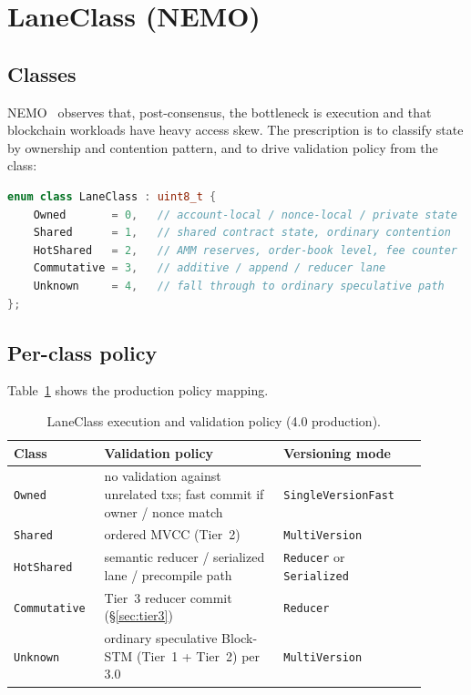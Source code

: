 \section{LaneClass (NEMO)}

\label{sec:laneclass}

\subsection{Classes}

NEMO~\cite{nemo2025} observes that, post-consensus, the bottleneck is
execution and that blockchain workloads have heavy access skew. The
prescription is to classify state by ownership and contention pattern,
and to drive validation policy from the class:

\begin{lstlisting}[language=C++]
enum class LaneClass : uint8_t {
    Owned       = 0,   // account-local / nonce-local / private state
    Shared      = 1,   // shared contract state, ordinary contention
    HotShared   = 2,   // AMM reserves, order-book level, fee counter
    Commutative = 3,   // additive / append / reducer lane
    Unknown     = 4,   // fall through to ordinary speculative path
};
\end{lstlisting}

\subsection{Per-class policy}

Table~\ref{tab:laneclass-policy} shows the production policy mapping.

\begin{table}[ht]
\centering
\small
\caption{LaneClass execution and validation policy (4.0 production).}
\label{tab:laneclass-policy}
\begin{tabular}{p{0.18\linewidth}p{0.40\linewidth}p{0.32\linewidth}}
\toprule
\textbf{Class} & \textbf{Validation policy} & \textbf{Versioning mode} \\
\midrule
\texttt{Owned}       & no validation against unrelated txs; fast commit if owner / nonce match               & \texttt{SingleVersionFast} \\
\texttt{Shared}      & ordered MVCC (Tier~2)                                                                  & \texttt{MultiVersion} \\
\texttt{HotShared}   & semantic reducer / serialized lane / precompile path                                  & \texttt{Reducer} or \texttt{Serialized} \\
\texttt{Commutative} & Tier~3 reducer commit (\S\ref{sec:tier3})                                              & \texttt{Reducer} \\
\texttt{Unknown}     & ordinary speculative Block-STM (Tier~1 + Tier~2) per 3.0~\cite{lp010-quasarstm-3}     & \texttt{MultiVersion} \\
\bottomrule
\end{tabular}
\end{table}

